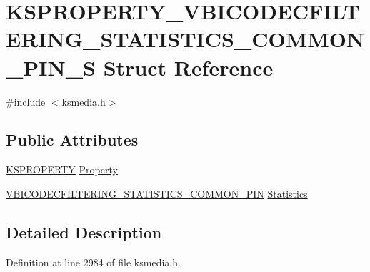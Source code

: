 \hypertarget{struct_k_s_p_r_o_p_e_r_t_y___v_b_i_c_o_d_e_c_f_i_l_t_e_r_i_n_g___s_t_a_t_i_s_t_i_c_s___c_o_m_m_o_n___p_i_n___s}{}\section{K\+S\+P\+R\+O\+P\+E\+R\+T\+Y\+\_\+\+V\+B\+I\+C\+O\+D\+E\+C\+F\+I\+L\+T\+E\+R\+I\+N\+G\+\_\+\+S\+T\+A\+T\+I\+S\+T\+I\+C\+S\+\_\+\+C\+O\+M\+M\+O\+N\+\_\+\+P\+I\+N\+\_\+S Struct Reference}
\label{struct_k_s_p_r_o_p_e_r_t_y___v_b_i_c_o_d_e_c_f_i_l_t_e_r_i_n_g___s_t_a_t_i_s_t_i_c_s___c_o_m_m_o_n___p_i_n___s}


{\ttfamily \#include $<$ksmedia.\+h$>$}

\subsection*{Public Attributes}
\begin{DoxyCompactItemize}
\item 
\hyperlink{ks_8h_a4392f77c74e868d813d46c39ada4d660}{K\+S\+P\+R\+O\+P\+E\+R\+TY} \hyperlink{struct_k_s_p_r_o_p_e_r_t_y___v_b_i_c_o_d_e_c_f_i_l_t_e_r_i_n_g___s_t_a_t_i_s_t_i_c_s___c_o_m_m_o_n___p_i_n___s_a97b71b1568ede7a156b85d47e291a84e}{Property}
\item 
\hyperlink{ksmedia_8h_a2ad90e30b6d4b469e96c511a77b2cf09}{V\+B\+I\+C\+O\+D\+E\+C\+F\+I\+L\+T\+E\+R\+I\+N\+G\+\_\+\+S\+T\+A\+T\+I\+S\+T\+I\+C\+S\+\_\+\+C\+O\+M\+M\+O\+N\+\_\+\+P\+IN} \hyperlink{struct_k_s_p_r_o_p_e_r_t_y___v_b_i_c_o_d_e_c_f_i_l_t_e_r_i_n_g___s_t_a_t_i_s_t_i_c_s___c_o_m_m_o_n___p_i_n___s_ab193df42c07fa81b56579f62035ebbfc}{Statistics}
\end{DoxyCompactItemize}


\subsection{Detailed Description}


Definition at line 2984 of file ksmedia.\+h.



